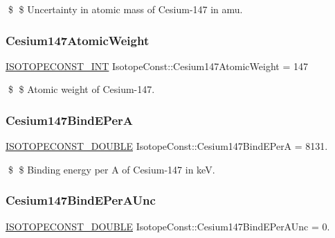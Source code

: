 \$ \$ Uncertainty in atomic mass of Cesium-\/147 in amu. \mbox{\label{group___isotope_const-_cesium-_cs147_ga1dedcf764a3126d837083024b1182d49}} 
\subsubsection{\texorpdfstring{Cesium147\+Atomic\+Weight}{Cesium147AtomicWeight}}
{\footnotesize\ttfamily \mbox{\hyperlink{group___isotope_const-_macros_ga5f18360b3e99483a35c32d789e62621c}{I\+S\+O\+T\+O\+P\+E\+C\+O\+N\+S\+T\+\_\+\+I\+NT}} Isotope\+Const\+::\+Cesium147\+Atomic\+Weight = 147}

\$ \$ Atomic weight of Cesium-\/147. \mbox{\label{group___isotope_const-_cesium-_cs147_gabcdcc3380e66b4836eb163f2aec64bbf}} 
\subsubsection{\texorpdfstring{Cesium147\+Bind\+E\+PerA}{Cesium147BindEPerA}}
{\footnotesize\ttfamily \mbox{\hyperlink{group___isotope_const-_macros_ga8f45a7272ce02c0b4c65c44636ed719a}{I\+S\+O\+T\+O\+P\+E\+C\+O\+N\+S\+T\+\_\+\+D\+O\+U\+B\+LE}} Isotope\+Const\+::\+Cesium147\+Bind\+E\+PerA = 8131.}

\$ \$ Binding energy per A of Cesium-\/147 in keV. \mbox{\label{group___isotope_const-_cesium-_cs147_gae60123b21541de1c4395398fce1b1a44}} 
\subsubsection{\texorpdfstring{Cesium147\+Bind\+E\+Per\+A\+Unc}{Cesium147BindEPerAUnc}}
{\footnotesize\ttfamily \mbox{\hyperlink{group___isotope_const-_macros_ga8f45a7272ce02c0b4c65c44636ed719a}{I\+S\+O\+T\+O\+P\+E\+C\+O\+N\+S\+T\+\_\+\+D\+O\+U\+B\+LE}} Isotope\+Const\+::\+Cesium147\+Bind\+E\+Per\+A\+Unc = 0.}

